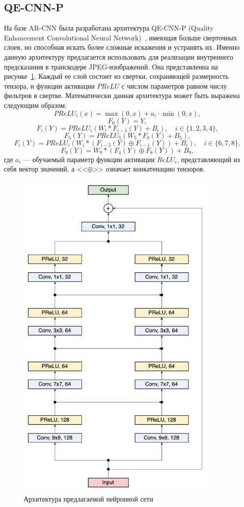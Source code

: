 \documentclass[times,specification,annotation]{itmo-student-thesis}
\begin{document}
\subsection{QE-CNN-P}\label{subsection:qe-cnn}

На базе AR-CNN была разработана архитектура QE-CNN-P (Quality Enhancement Convolutional Neural Network)~\cite{qe-cnn-overview}, имеющая больше сверточных слоев, но способная искать более сложные искажения и устранять их. Именно данную архитектуру предлагается использовать для реализации внутреннего предсказания в транскодере JPEG-изображений. Она представленна на рисунке~\ref{model-architecture}. Каждый ее слой состоит из свертки, сохраняющей размерность тензора, и функции активации $PReLU$ с числом параметров равном числу фильтров в свертке. Математически данная архитектура может быть выражена следующим образом:
\[
    PReLU_i(x) = \max(0, x) + a_i \cdot \min(0, x),
\]
\[
    F_0(Y) = Y,
\]
\[
    F_i(Y) = PReLU_i(W_i * F_{i-1}(Y) + B_i),\quad i \in \{1, 2, 3, 4\},
\]
\[
    F_5(Y) = PReLU_5(W_5 * F_0(Y) + B_5),
\]
\[
    F_i(Y) = PReLU_i(W_i * (F_{i-5}(Y) \oplus F_{i-1}(Y)) + B_i),\quad i \in \{6, 7, 8\},
\]
\[
    F_9(Y) = W_9 * (F_4(Y) \oplus F_8(Y)) + B_9,
\]
где $a_i$ --- обучаемый параметр функции активации $ReLU_i$, представляющий из себя вектор значений, а <<$\oplus$>> означает конкатенацию тензоров.\par

\begin{figure}[!h]
    \centering
    \includegraphics[width=10cm]{./images/model-architecture.png}
    \caption{Архитектура предлагаемой нейронной сети}
    \label{model-architecture}
\end{figure}
\end{document}
